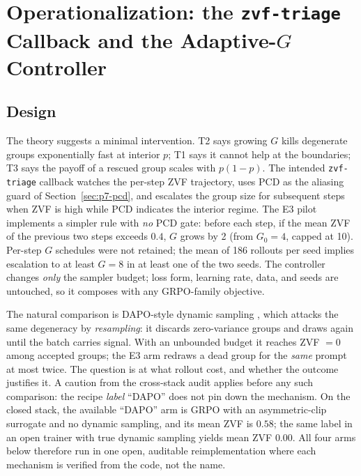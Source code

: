 \section{Operationalization: the \texttt{zvf-triage} Callback and the
Adaptive-\texorpdfstring{$G$}{G} Controller}
\label{sec:p7-controller}
\label{sec:p7-controller-family}

\subsection{Design}
\label{sec:p7-controller-design}
The theory suggests a minimal intervention. T2 says growing $G$ kills
degenerate groups exponentially fast at interior $p$; T1 says it cannot help
at the boundaries; T3 says the payoff of a rescued group scales with
$p(1-p)$. The intended \texttt{zvf-triage} callback watches the per-step
ZVF trajectory, uses PCD as the aliasing guard of Section~\ref{sec:p7-pcd},
and escalates the group size for subsequent steps when ZVF is high while PCD
indicates the interior regime. The E3 pilot implements a simpler rule with
\emph{no} PCD gate: before each step, if the mean ZVF of the previous two
steps exceeds $0.4$, $G$ grows by 2 (from $G_0{=}4$, capped at 10). Per-step
$G$ schedules were not retained; the mean of 186 rollouts per seed implies
escalation to at least $G{=}8$ in at least one of the two seeds. The controller changes
\emph{only} the sampler budget; loss form, learning rate, data, and seeds
are untouched, so it composes with any GRPO-family objective.

The natural comparison is DAPO-style dynamic sampling \citep{yu2025dapo},
which attacks the same degeneracy by \emph{resampling}: it discards
zero-variance groups and draws again until the batch carries signal. With an
unbounded budget it reaches ZVF $= 0$ among accepted groups; the E3 arm
redraws a dead group for the \emph{same} prompt at most twice. The question
is at what rollout cost, and whether the outcome justifies it.
A caution from the cross-stack audit applies before any such comparison:
the recipe \emph{label} ``DAPO'' does not pin down the mechanism. On the
closed stack, the available ``DAPO'' arm is GRPO with an asymmetric-clip
surrogate and no dynamic sampling, and its mean ZVF is $0.58$; the same
label in an open trainer with true dynamic sampling yields mean ZVF
$0.00$. All four arms below therefore run in one open, auditable
reimplementation where each mechanism is verified from the code, not the
name.

